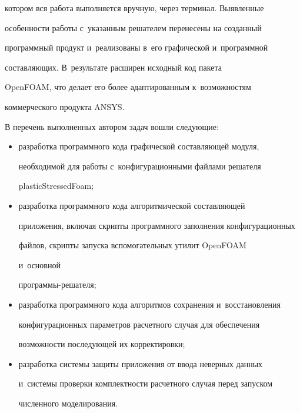 котором вся работа выполняется вручную, через терминал. Выявленные 


особенности работы с~указанным решателем перенесены на созданный 


программный продукт и~реализованы в~его графической и~программной 


со\-став\-ля\-ющих. В~результате расширен исходный код пакета 


\mbox{OpenFOAM}, что делает его более адап\-ти\-ро\-ван\-ным к~возможностям 


коммерческого продукта ANSYS.


   


   В перечень выполненных автором задач вошли следующие:


   \begin{itemize}


\item разработка программного кода графической со\-став\-ля\-ющей модуля, 


необходимой для работы с~конфигурационными файлами решателя 


\mbox{plasticStressedFoam};


\item разработка программного кода алгоритмической со\-став\-ля\-ющей 


приложения, включая скрипты программного заполнения конфигурационных 


файлов, скрипты за\-пус\-ка вспомогательных утилит \mbox{OpenFOAM} 


и~основной  


про\-грам\-мы-ре\-ша\-теля;


\item разработка программного кода алгоритмов сохранения и~восстановления 


конфигурационных па\-ра\-мет\-ров расчетного случая для обеспечения 


воз\-мож\-ности по\-сле\-ду\-ющей их корректировки;


\item разработка сис\-те\-мы защиты приложения от ввода неверных данных 


и~сис\-те\-мы проверки комп\-лект\-ности расчетного случая перед запуском 


чис\-лен\-но\-го моделирования.


\end{itemize}





